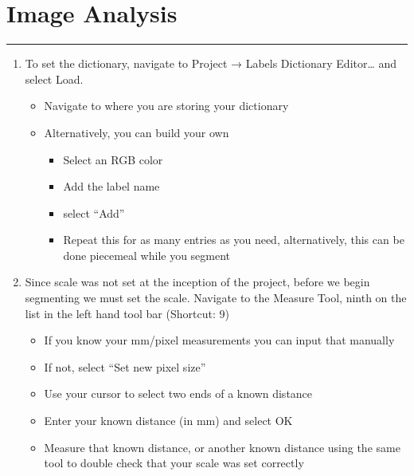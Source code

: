 \documentclass[
]{article}
\providecommand{\tightlist}{%
  \setlength{\itemsep}{0pt}\setlength{\parskip}{0pt}}
\begin{document}
\hypertarget{image-analysis}{%
\section{Image Analysis}\label{image-analysis}}

\begin{center}\rule{0.5\linewidth}{0.5pt}\end{center}

\begin{enumerate}
\def\labelenumi{\arabic{enumi}.}
\tightlist
\item
  To set the dictionary, navigate to Project → Labels Dictionary
  Editor\ldots{} and select Load.

  \begin{itemize}
  \tightlist
  \item
    Navigate to where you are storing your dictionary
  \item
    Alternatively, you can build your own

    \begin{itemize}
    \tightlist
    \item
      Select an RGB color
    \item
      Add the label name
    \item
      select ``Add''
    \item
      Repeat this for as many entries as you need, alternatively, this
      can be done piecemeal while you segment
    \end{itemize}
  \end{itemize}
\item
  Since scale was not set at the inception of the project, before we
  begin segmenting we must set the scale. Navigate to the Measure Tool,
  ninth on the list in the left hand tool bar (Shortcut: 9)

  \begin{itemize}
  \tightlist
  \item
    If you know your mm/pixel measurements you can input that manually
  \item
    If not, select ``Set new pixel size''
  \item
    Use your cursor to select two ends of a known distance
  \item
    Enter your known distance (in mm) and select OK
  \item
    Measure that known distance, or another known distance using the
    same tool to double check that your scale was set correctly
  \end{itemize}
\end{enumerate}
\end{document}
